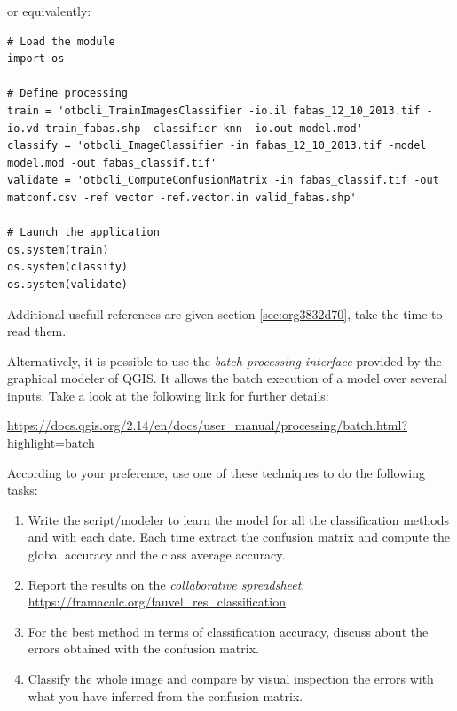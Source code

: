 \documentclass[a4paper,11pt,DIV=18]{scrartcl}
\begin{document}
or equivalently:

\begin{verbatim}
# Load the module
import os

# Define processing
train = 'otbcli_TrainImagesClassifier -io.il fabas_12_10_2013.tif -io.vd train_fabas.shp -classifier knn -io.out model.mod'
classify = 'otbcli_ImageClassifier -in fabas_12_10_2013.tif -model model.mod -out fabas_classif.tif'
validate = 'otbcli_ComputeConfusionMatrix -in fabas_classif.tif -out matconf.csv -ref vector -ref.vector.in valid_fabas.shp'

# Launch the application
os.system(train)
os.system(classify)
os.system(validate)
\end{verbatim}

Additional usefull references are  given section \ref{sec:org3832d70}, take the
time to read them.

Alternatively, it  is possible to  use the \emph{batch  processing interface}
provided  by the  graphical  modeler  of QGIS.   It  allows the  batch
execution of a model over several inputs. Take a look at the following
link for further details:

\begin{center}
\url{https://docs.qgis.org/2.14/en/docs/user\_manual/processing/batch.html?highlight=batch}
\end{center}

According to  your preference, use one  of these techniques to  do the
following tasks:

\begin{work}
\begin{enumerate}
\item Write  the   script/modeler  to  learn  the  model   for  all  the
classification methods and  with each date.  Each  time extract the
confusion  matrix and  compute the  global accuracy  and the  class
average accuracy.
\item Report   the   results    on   the   \emph{collaborative   spreadsheet}:
\url{https://framacalc.org/fauvel\_res\_classification}
\item For  the best method  in terms of classification  accuracy, discuss
about the errors obtained with the confusion matrix.
\item Classify the  whole image  and  compare by  visual inspection  the
errors with what you have inferred from the confusion matrix.
\end{enumerate}
\end{work}
\end{document}

